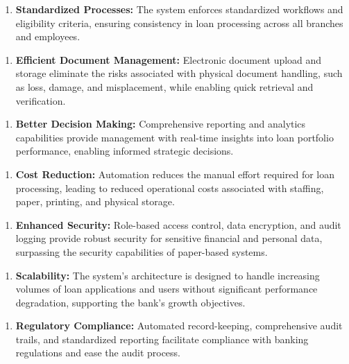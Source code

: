 \begin{enumerate}
  \item \textbf{Standardized Processes:} The system enforces standardized workflows and eligibility criteria, ensuring consistency in loan processing across all branches and employees.
\end{enumerate}

\begin{enumerate}
  \item \textbf{Efficient Document Management:} Electronic document upload and storage eliminate the risks associated with physical document handling, such as loss, damage, and misplacement, while enabling quick retrieval and verification.
\end{enumerate}

\begin{enumerate}
  \item \textbf{Better Decision Making:} Comprehensive reporting and analytics capabilities provide management with real-time insights into loan portfolio performance, enabling informed strategic decisions.
\end{enumerate}

\begin{enumerate}
  \item \textbf{Cost Reduction:} Automation reduces the manual effort required for loan processing, leading to reduced operational costs associated with staffing, paper, printing, and physical storage.
\end{enumerate}

\begin{enumerate}
  \item \textbf{Enhanced Security:} Role-based access control, data encryption, and audit logging provide robust security for sensitive financial and personal data, surpassing the security capabilities of paper-based systems.
\end{enumerate}

\begin{enumerate}
  \item \textbf{Scalability:} The system's architecture is designed to handle increasing volumes of loan applications and users without significant performance degradation, supporting the bank's growth objectives.
\end{enumerate}

\begin{enumerate}
  \item \textbf{Regulatory Compliance:} Automated record-keeping, comprehensive audit trails, and standardized reporting facilitate compliance with banking regulations and ease the audit process.
\end{enumerate}

